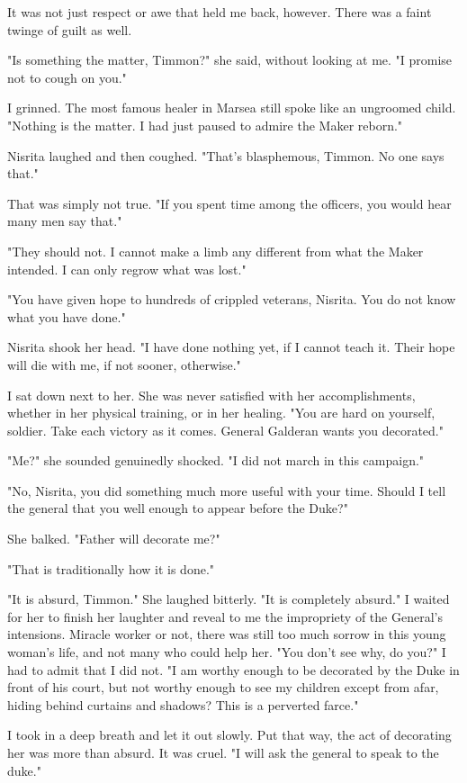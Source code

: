 \documentclass{article}
\begin{document}
It was not just respect or awe that held me back, however. There was a faint twinge of guilt as well.

"Is something the matter, Timmon?" she said, without looking at me. "I promise not to cough on you." 

I grinned. The most famous healer in Marsea still spoke like an ungroomed child. "Nothing is the matter. I had just paused to admire the Maker reborn."

Nisrita laughed and then coughed. "That's blasphemous, Timmon. No one says that."

That was simply not true. "If you spent time among the officers, you would hear many men say that."

"They should not. I cannot make a limb any different from what the Maker intended. I can only regrow what was lost." 

"You have given hope to hundreds of crippled veterans, Nisrita. You do not know what you have done."

Nisrita shook her head. "I have done nothing yet, if I cannot teach it. Their hope will die with me, if not sooner, otherwise."

I sat down next to her. She was never satisfied with her accomplishments, whether in her physical training, or in her healing. "You are hard on yourself, soldier. Take each victory as it comes. General Galderan wants you decorated."

"Me?" she sounded genuinedly shocked. "I did not march in this campaign."

"No, Nisrita, you did something much more useful with your time. Should I tell the general that you well enough to appear before the Duke?"

She balked. "Father will decorate me?"

"That is traditionally how it is done."

"It is absurd, Timmon." She laughed bitterly. "It is completely absurd." I waited for her to finish her laughter and reveal to me the impropriety of the General's intensions. Miracle worker or not, there was still too much sorrow in this young woman's life, and not many who could help her. "You don't see why, do you?" I had to admit that I did not. "I am worthy enough to be decorated by the Duke in front of his court, but not worthy enough to see my children except from afar, hiding behind curtains and shadows? This is a perverted farce."

I took in a deep breath and let it out slowly. Put that way, the act of decorating her was more than absurd. It was cruel. "I will ask the general to speak to the duke."
\end{document}
